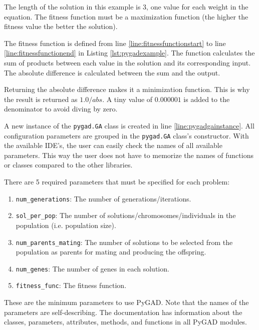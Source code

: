 \documentclass[conference]{IEEEtran}
\begin{document}
The length of the solution in this example is 3, one value for each weight in the equation. The fitness function must be a maximization function (the higher the fitness value the better the solution).

The fitness function is defined from line \ref{line:fitnessfunctionstart} to line \ref{line:fitnessfunctionend} in Listing \ref{lst:pygadexample}. The function calculates the sum of products between each value in the solution and its corresponding input. The absolute difference is calculated between the sum and the output. 

Returning the absolute difference makes it a minimization function. This is why the result is returned as $1.0/abs$. A tiny value of $0.000001$ is added to the denominator to avoid diving by zero.

A new instance of the \texttt{pygad.GA} class is created in line \ref{line:pygadgainstance}. All configuration parameters are grouped in the \texttt{pygad.GA} class's constructor. With the available IDE's, the user can easily check the names of all available parameters. This way the user does not have to memorize the names of functions or classes compared to the other libraries. 

There are 5 required parameters that must be specified for each problem:
\begin{enumerate}
    \item \texttt{num\_generations}: The number of generations/iterations.
    \item \texttt{sol\_per\_pop}: The number of solutions/chromosomes/individuals in the population (i.e. population size).
    \item \texttt{num\_parents\_mating}: The number of solutions to be selected from the population as parents for mating and producing the offspring.
    \item \texttt{num\_genes}: The number of genes in each solution.
    \item \texttt{fitness\_func}: The fitness function.
\end{enumerate}

These are the minimum parameters to use PyGAD. Note that the names of the parameters are self-describing. The documentation has information about the classes, parameters, attributes, methods, and functions in all PyGAD modules. \hfill \break
\end{document}
